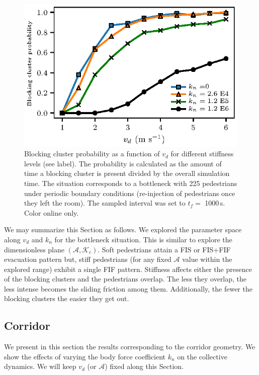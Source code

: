 \documentclass[preprint,12pt]{elsarticle}
\begin{document}
\begin{figure}[htbp!]
\centering
\includegraphics[width=0.7\columnwidth]
{./pbc_vs_vd_multi_kn.eps}
\caption{\label{pbc_vs_vd_multi_kn} Blocking cluster probability as a function of $v_d$ for different stiffness levels (see label). The probability is calculated as the amount of time a blocking cluster is present divided by the overall simulation time. The situation corresponds to a bottleneck with 225 pedestrians under periodic boundary conditions (re-injection of pedestrians once they left the room). The sampled interval was set to $t_f =$ 1000$\,$s. Color online only. }
\end{figure}

We may summarize this Section as follows. We explored the parameter space along $v_d$ and $k_n$ for the bottleneck situation. This is similar to explore the dimensionless plane $(\mathcal{A},\mathcal{K}_c)$. Soft pedestrians attain a FIS or FIS+FIF evacuation pattern but, stiff pedestrians (for any fixed $\mathcal{A}$ value within the explored range) exhibit a single FIF pattern. Stiffness affects either the presence of the blocking clusters and the pedestrians overlap. The less they overlap, the less intense becomes the sliding friction among them. Additionally, the fewer the blocking clusters the easier they get out. \\



\subsection{\label{corridor} Corridor}

We present in this section the results corresponding to the corridor geometry. 
We show the effects of varying the body force coefficient $k_n$ on the 
collective dynamics. We will keep $v_d$ (or $\mathcal{A}$) 
fixed along this Section. \\
\end{document}

